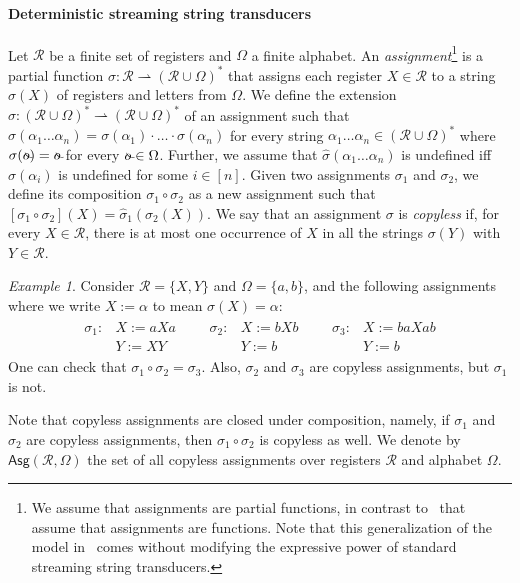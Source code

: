 \documentclass[
a4paper
]{article}
\theoremstyle{plain}
\theoremstyle{definition}
\theoremstyle{remark}
\newtheorem{example}[theorem]{Example}
\newcommand{\pmap}{\rightharpoonup}
\newcommand{\Reg}{\mathcal{R}}
\newcommand{\Asg}{\operatorname{Asg}}
\DeclareMathOperator{\oout}{%
	\ooalign{\scalebox{1.0}[1.0]{$o$}\cr\hidewidth\rotatebox[origin=c]{-30}{\raisebox{.4ex}{\scalebox{0.65}{$\  \boldsymbol{\smile}$}}}\hidewidth}}%
\renewcommand{\operatorname}[1]{\textsf{#1}}
\begin{document}
\paragraph{Deterministic streaming string transducers} Let $\Reg$ be a finite set of registers and $\Omega$ a finite alphabet. An \emph{assignment}\footnote{We assume that assignments are partial functions, in contrast to~\cite{AlurD11} that assume that assignments are functions. 
  Note that this generalization of the model in~\cite{AlurD11} comes without modifying the expressive power of standard
  streaming string transducers.
} is a partial function $\sigma: \Reg \pmap (\Reg \cup \Omega)^*$ that assigns each register $X \in \Reg$ to a string $\sigma(X)$ of registers and letters from $\Omega$.
We define the extension $\hat{\sigma}: (\Reg \cup \Omega)^* \pmap (\Reg \cup \Omega)^*$ of an assignment such that $\hat{\sigma}(\alpha_1 \ldots \alpha_n) = \sigma(\alpha_1) \cdot \ldots \cdot \sigma(\alpha_n)$ for every string $\alpha_1\ldots \alpha_n \in (\Reg \cup \Omega)^*$ where $\sigma(\oout) = \oout$ for every $\oout \in \Omega$. Further, we assume that $\hat{\sigma}(\alpha_1 \ldots \alpha_n)$ is undefined iff $\sigma(\alpha_i)$ is undefined for some $i \in [n]$. Given two assignments $\sigma_1$ and $\sigma_2$, we define its composition $\sigma_1 \circ \sigma_2$ as a new assignment such that $[\sigma_1 \circ \sigma_2](X) = \hat{\sigma}_1(\sigma_2(X))$. We say that an assignment $\sigma$ is \emph{copyless} if, for every $X \in \Reg$, there is at most one occurrence of $X$ in all the strings $\sigma(Y)$ with $Y \in \Reg$.
\begin{example}
	Consider $\Reg= \{X, Y\}$ and $\Omega = \{a,b\}$, and the following assignments where we write $X:= \alpha$ to mean $\sigma(X) = \alpha$:
	\[
	\begin{array}{ccccc}
		\begin{array}{rl}
			\sigma_1\colon \!\! & X := aXa \\
			& Y := XY
		\end{array} & &  
		\begin{array}{rl}
			\sigma_2\colon \!\!  & X := bXb \\
			& Y := b
		\end{array} &  &
		\begin{array}{rl}
			\sigma_3: \!\! & X := baXab \\
			& Y := b
		\end{array}
	\end{array}
	\]
	One can check that $\sigma_1 \circ \sigma_2 = \sigma_3$. Also, $\sigma_2$ and $\sigma_3$ are copyless assignments, but $\sigma_1$ is not. 
\end{example} 
Note that copyless assignments are closed under composition, namely, if $\sigma_1$ and $\sigma_2$ are copyless assignments, then $\sigma_1 \circ \sigma_2$ is copyless as well. We denote by $\Asg(\Reg, \Omega)$ the set of all copyless assignments over registers $\Reg$ and alphabet $\Omega$. 
\end{document}
